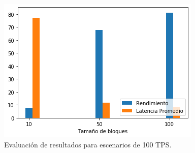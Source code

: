 \begin{figure}[h]
\centering
\includegraphics[scale=0.6]{Graphics/Resultado100TPS.png}
\caption{Evaluaci\'on de resultados para escenarios de 100 TPS.}
\label{Resultado100TPS}
\end{figure}

